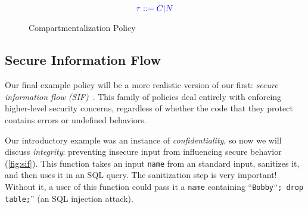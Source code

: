 \documentclass{llncs}
\begin{document}
\begin{figure}
  \color{blue}
  \begin{minipage}[t]{0.4\textwidth}
    \vspace{-3em}
    \[\color{blue} \tau ::= C | {\color{blue} N}\]

  
  \end{minipage}
  \begin{minipage}[t]{0.25\textwidth}
  \end{minipage}
  \begin{minipage}[t]{0.25\textwidth}
    
  \end{minipage}
    
  \caption{Compartmentalization Policy}
  \label{fig:compartments}
\end{figure}

\subsection{Secure Information Flow}

Our final example policy will be a more realistic version of our first:
{\em secure information flow (SIF)}~\cite{Denning77:SecureInformationFlow}.
This family of policies deal entirely with enforcing
higher-level security concerns, regardless of whether the code that they protect contains
errors or undefined behaviors.

Our introductory example was an instance of {\em confidentiality}, so now we will discuss
{\em integrity}: preventing insecure input from influencing secure behavior (\cref{fig:sif}).
This function takes an input {\tt name} from an standard input, sanitizes it, and then
uses it in an SQL query. The sanitization step is very important! Without it, a user
of this function could pass it a  {\tt name} containing ``{\tt Bobby"; drop table;}''
(an SQL injection attack\cite{??}).
\end{document}
